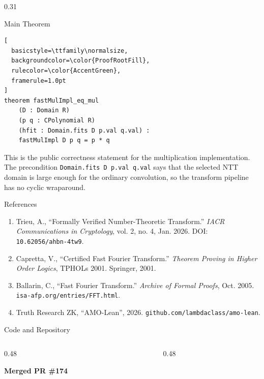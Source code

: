 \documentclass[final]{beamer}
\newcommand{\leaninline}[1]{\texttt{#1}}
\newenvironment{posterblock}[1]{%
  \begin{block}{#1}
  \vspace{0.35em}
}{%
  \vspace{0.25em}
  \end{block}
}
\begin{document}
\begin{frame}[fragile,t]
\begin{columns}[T,totalwidth=0.96\paperwidth]
\begin{column}{0.31\paperwidth}
\begin{posterblock}{Main Theorem}
\begin{lstlisting}[
  basicstyle=\ttfamily\normalsize,
  backgroundcolor=\color{ProofRootFill},
  rulecolor=\color{AccentGreen},
  framerule=1.0pt
]
theorem fastMulImpl_eq_mul
    (D : Domain R)
    (p q : CPolynomial R)
    (hfit : Domain.fits D p.val q.val) :
    fastMulImpl D p q = p * q
\end{lstlisting}

This is the public correctness statement for the multiplication implementation.
The precondition \leaninline{Domain.fits D p.val q.val} says that the selected NTT domain is large enough for the ordinary convolution, so the transform pipeline has no cyclic wraparound.
\end{posterblock}

\vspace{3.25cm}

\begin{posterblock}{References}
\begin{enumerate}\small
  \setlength{\itemsep}{0.22em}
  \item Trieu, A., ``Formally Verified Number-Theoretic Transform.'' \textit{IACR Communications in Cryptology}, vol. 2, no. 4, Jan. 2026. DOI: \texttt{10.62056/ahbn-4tw9}.
  \item Capretta, V., ``Certified Fast Fourier Transform.'' \textit{Theorem Proving in Higher Order Logics}, TPHOLs 2001. Springer, 2001.
  \item Ballarin, C., ``Fast Fourier Transform.'' \textit{Archive of Formal Proofs}, Oct. 2005. \texttt{isa-afp.org/entries/FFT.html}.
  \item Truth Research ZK, ``AMO-Lean'', 2026. \texttt{github.com/lambdaclass/amo-lean}.
\end{enumerate}
\end{posterblock}

\vspace{0.7cm}

\begin{posterblock}{Code and Repository}
\begin{columns}[T,totalwidth=\linewidth]
  \begin{column}{0.48\linewidth}
    \centering

    \vspace{0.22cm}
    \textbf{Merged PR \#174}
  \end{column}
  \begin{column}{0.48\linewidth}
    \centering


\end{column}
\end{columns}
\end{posterblock}
\end{column}
\end{columns}
\end{frame}
\end{document}
